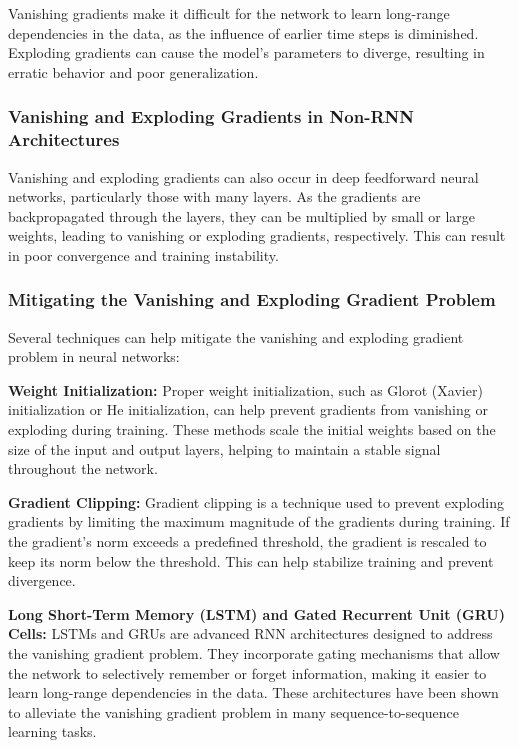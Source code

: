 \documentclass[12pt]{article}
\begin{document}
Vanishing gradients make it difficult for the network to learn long-range dependencies in the data, as the influence of earlier time steps is diminished. Exploding gradients can cause the model's parameters to diverge, resulting in erratic behavior and poor generalization.

\subsubsection{Vanishing and Exploding Gradients in Non-RNN Architectures}

Vanishing and exploding gradients can also occur in deep feedforward neural networks, particularly those with many layers. As the gradients are backpropagated through the layers, they can be multiplied by small or large weights, leading to vanishing or exploding gradients, respectively. This can result in poor convergence and training instability.

\subsubsection{Mitigating the Vanishing and Exploding Gradient Problem}

Several techniques can help mitigate the vanishing and exploding gradient problem in neural networks:

\textbf{Weight Initialization:} Proper weight initialization, such as Glorot (Xavier) initialization or He initialization, can help prevent gradients from vanishing or exploding during training. These methods scale the initial weights based on the size of the input and output layers, helping to maintain a stable signal throughout the network.

\textbf{Gradient Clipping:} Gradient clipping is a technique used to prevent exploding gradients by limiting the maximum magnitude of the gradients during training. If the gradient's norm exceeds a predefined threshold, the gradient is rescaled to keep its norm below the threshold. This can help stabilize training and prevent divergence.

\textbf{Long Short-Term Memory (LSTM) and Gated Recurrent Unit (GRU) Cells:} LSTMs and GRUs are advanced RNN architectures designed to address the vanishing gradient problem. They incorporate gating mechanisms that allow the network to selectively remember or forget information, making it easier to learn long-range dependencies in the data. These architectures have been shown to alleviate the vanishing gradient problem in many sequence-to-sequence learning tasks.
\end{document}
